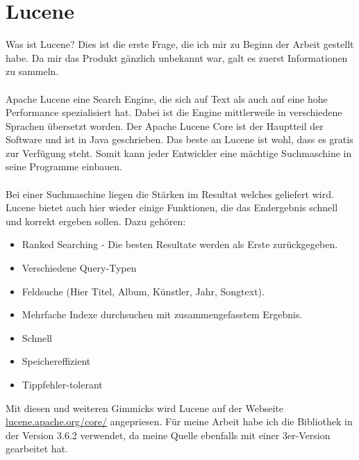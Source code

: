 \documentclass[12pt,a4paper,ngerman]{report}
\begin{document}
\section{Lucene}
Was ist Lucene? Dies ist die erste Frage, die ich mir zu Beginn der Arbeit gestellt habe. Da mir das Produkt gänzlich unbekannt war, galt es zuerst Informationen zu sammeln.\\
\\
Apache Lucene eine Search Engine, die sich auf Text als auch auf eine hohe Performance spezialisiert hat. Dabei ist die Engine mittlerweile in verschiedene Sprachen übersetzt worden. Der Apache Lucene Core ist der Hauptteil der Software und ist in Java geschrieben. Das beste an Lucene ist wohl, dass es gratis zur Verfügung steht. Somit kann jeder Entwickler eine mächtige Suchmaschine in seine Programme einbauen. \\
\\
Bei einer Suchmaschine liegen die Stärken im Resultat welches geliefert wird. Lucene bietet auch hier wieder einige Funktionen, die das Endergebnis schnell und korrekt ergeben sollen. Dazu gehören:
\begin{itemize}
	\item Ranked Searching - Die besten Resultate werden als Erste zurückgegeben.
	\item Verschiedene Query-Typen
	\item Feldsuche (Hier Titel, Album, Künstler, Jahr, Songtext).
	\item Mehrfache Indexe durchsuchen mit zusammengefasstem Ergebnis.
	\item Schnell
	\item Speichereffizient
	\item Tippfehler-tolerant
\end{itemize}
Mit diesen und weiteren Gimmicks wird Lucene auf der Webseite \url{lucene.apache.org/core/} angepriesen. Für meine Arbeit habe ich die Bibliothek in der Version 3.6.2 verwendet, da meine Quelle ebenfalls mit einer 3er-Version gearbeitet hat.
\end{document}
